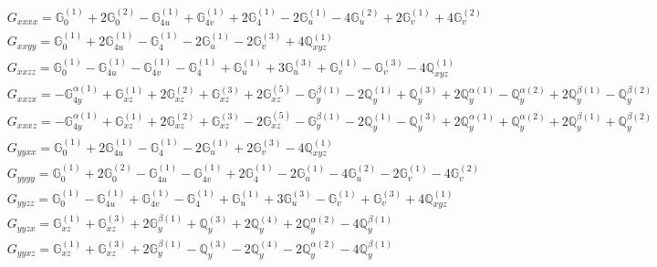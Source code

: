 \documentclass[fleqn,8pt,landscape]{jsarticle}
\begin{document}
\begin{align*}
& G_{xxxx} = \mathbb{G}_{0}^{(1)} + 2 \mathbb{G}_{0}^{(2)} - \mathbb{G}_{4u}^{(1)} + \mathbb{G}_{4v}^{(1)} + 2 \mathbb{G}_{4}^{(1)} - 2 \mathbb{G}_{u}^{(1)} - 4 \mathbb{G}_{u}^{(2)} + 2 \mathbb{G}_{v}^{(1)} + 4 \mathbb{G}_{v}^{(2)} \\
& G_{xxyy} = \mathbb{G}_{0}^{(1)} + 2 \mathbb{G}_{4u}^{(1)} - \mathbb{G}_{4}^{(1)} - 2 \mathbb{G}_{u}^{(1)} - 2 \mathbb{G}_{v}^{(3)} + 4 \mathbb{Q}_{xyz}^{(1)} \\
& G_{xxzz} = \mathbb{G}_{0}^{(1)} - \mathbb{G}_{4u}^{(1)} - \mathbb{G}_{4v}^{(1)} - \mathbb{G}_{4}^{(1)} + \mathbb{G}_{u}^{(1)} + 3 \mathbb{G}_{u}^{(3)} + \mathbb{G}_{v}^{(1)} - \mathbb{G}_{v}^{(3)} - 4 \mathbb{Q}_{xyz}^{(1)} \\
& G_{xxzx} = - \mathbb{G}_{4y}^{\alpha(1)} + \mathbb{G}_{xz}^{(1)} + 2 \mathbb{G}_{xz}^{(2)} + \mathbb{G}_{xz}^{(3)} + 2 \mathbb{G}_{xz}^{(5)} - \mathbb{G}_{y}^{\beta(1)} - 2 \mathbb{Q}_{y}^{(1)} + \mathbb{Q}_{y}^{(3)} + 2 \mathbb{Q}_{y}^{\alpha(1)} - \mathbb{Q}_{y}^{\alpha(2)} + 2 \mathbb{Q}_{y}^{\beta(1)} - \mathbb{Q}_{y}^{\beta(2)} \\
& G_{xxxz} = - \mathbb{G}_{4y}^{\alpha(1)} + \mathbb{G}_{xz}^{(1)} + 2 \mathbb{G}_{xz}^{(2)} + \mathbb{G}_{xz}^{(3)} - 2 \mathbb{G}_{xz}^{(5)} - \mathbb{G}_{y}^{\beta(1)} - 2 \mathbb{Q}_{y}^{(1)} - \mathbb{Q}_{y}^{(3)} + 2 \mathbb{Q}_{y}^{\alpha(1)} + \mathbb{Q}_{y}^{\alpha(2)} + 2 \mathbb{Q}_{y}^{\beta(1)} + \mathbb{Q}_{y}^{\beta(2)} \\
& G_{yyxx} = \mathbb{G}_{0}^{(1)} + 2 \mathbb{G}_{4u}^{(1)} - \mathbb{G}_{4}^{(1)} - 2 \mathbb{G}_{u}^{(1)} + 2 \mathbb{G}_{v}^{(3)} - 4 \mathbb{Q}_{xyz}^{(1)} \\
& G_{yyyy} = \mathbb{G}_{0}^{(1)} + 2 \mathbb{G}_{0}^{(2)} - \mathbb{G}_{4u}^{(1)} - \mathbb{G}_{4v}^{(1)} + 2 \mathbb{G}_{4}^{(1)} - 2 \mathbb{G}_{u}^{(1)} - 4 \mathbb{G}_{u}^{(2)} - 2 \mathbb{G}_{v}^{(1)} - 4 \mathbb{G}_{v}^{(2)} \\
& G_{yyzz} = \mathbb{G}_{0}^{(1)} - \mathbb{G}_{4u}^{(1)} + \mathbb{G}_{4v}^{(1)} - \mathbb{G}_{4}^{(1)} + \mathbb{G}_{u}^{(1)} + 3 \mathbb{G}_{u}^{(3)} - \mathbb{G}_{v}^{(1)} + \mathbb{G}_{v}^{(3)} + 4 \mathbb{Q}_{xyz}^{(1)} \\
& G_{yyzx} = \mathbb{G}_{xz}^{(1)} + \mathbb{G}_{xz}^{(3)} + 2 \mathbb{G}_{y}^{\beta(1)} + \mathbb{Q}_{y}^{(3)} + 2 \mathbb{Q}_{y}^{(4)} + 2 \mathbb{Q}_{y}^{\alpha(2)} - 4 \mathbb{Q}_{y}^{\beta(1)} \\
& G_{yyxz} = \mathbb{G}_{xz}^{(1)} + \mathbb{G}_{xz}^{(3)} + 2 \mathbb{G}_{y}^{\beta(1)} - \mathbb{Q}_{y}^{(3)} - 2 \mathbb{Q}_{y}^{(4)} - 2 \mathbb{Q}_{y}^{\alpha(2)} - 4 \mathbb{Q}_{y}^{\beta(1)} \\

\end{align*}
\end{document}
